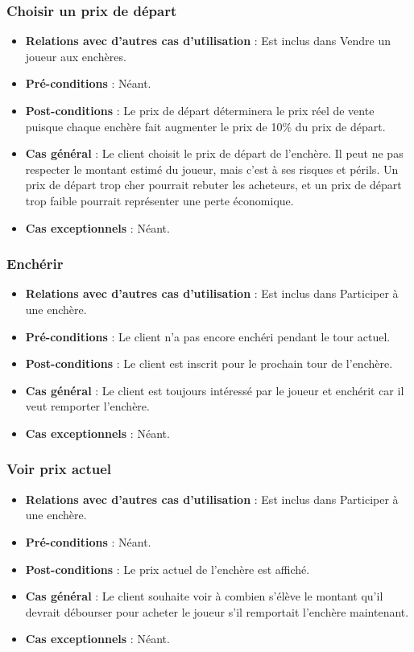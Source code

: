 \documentclass[a4paper,titlepage]{scrreprt}
\begin{document}
    \subsubsection{Choisir un prix de départ}
      \begin{itemize}
        \item \textbf{Relations avec d'autres cas d'utilisation}  : Est inclus dans Vendre un joueur aux enchères.
        \item \textbf{Pré-conditions} : Néant.
        \item \textbf{Post-conditions} : Le prix de départ déterminera le prix réel de vente puisque chaque enchère fait augmenter le prix de 10\% du prix de départ.
        \item \textbf{Cas général} : Le client choisit le prix de départ de l'enchère. Il peut ne pas respecter le montant estimé du joueur, mais c'est à ses risques et périls. Un prix de départ trop cher pourrait rebuter les acheteurs, et un prix de départ trop faible pourrait représenter une perte économique.
        \item \textbf{Cas exceptionnels} : Néant.
      \end{itemize}

    \subsubsection{Enchérir}
      \begin{itemize}
        \item \textbf{Relations avec d'autres cas d'utilisation}  : Est inclus dans Participer à une enchère.
        \item \textbf{Pré-conditions} : Le client n'a pas encore enchéri pendant le tour actuel.
        \item \textbf{Post-conditions} : Le client est inscrit pour le prochain tour de l'enchère.
        \item \textbf{Cas général} : Le client est toujours intéressé par le joueur et enchérit car il veut remporter l'enchère.
        \item \textbf{Cas exceptionnels} : Néant.
      \end{itemize}

    \subsubsection{Voir prix actuel}
      \begin{itemize}
        \item \textbf{Relations avec d'autres cas d'utilisation}  : Est inclus dans Participer à une enchère.
        \item \textbf{Pré-conditions} : Néant.
        \item \textbf{Post-conditions} : Le prix actuel de l'enchère est affiché.
        \item \textbf{Cas général} : Le client souhaite voir à combien s'élève le montant qu'il devrait débourser pour acheter le joueur s'il remportait l'enchère maintenant.
        \item \textbf{Cas exceptionnels} : Néant.
      \end{itemize}
\end{document}
